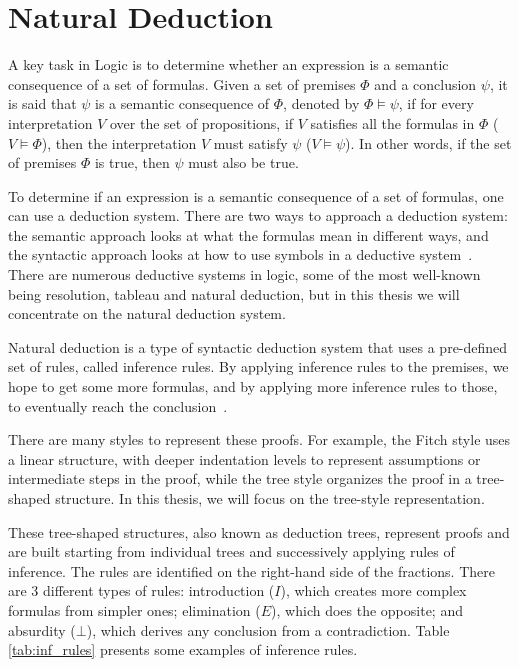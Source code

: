 \section{Natural Deduction} 

\label{chap:prop-decution}
A key task in Logic is to determine whether an expression is a semantic consequence of a set of formulas. Given a set of premises \(\Phi \) and a conclusion \(\psi\), it is said that \(\psi\) is a semantic consequence of \(\Phi \), denoted by \(\Phi  \models \psi \), if for every interpretation \( V \) over the set of propositions, if \( V \) satisfies all the formulas in \(\Phi \) (\( V \models \Phi  \)), then the interpretation \( V \) must satisfy \(\psi\) (\( V \models \psi \)). In other words, if the set of premises \(\Phi \) is true, then \(\psi\) must also be true. 

To determine if an expression is a semantic consequence of a set of formulas, one can use a deduction system. There are two ways to approach a deduction system: the semantic approach looks at what the formulas mean in different ways, and the syntactic approach looks at how to use symbols in a deductive system~\cite{gouveia_lgica}. There are numerous deductive systems in logic, some of the most well-known being  resolution, tableau and natural deduction, but in this thesis we will concentrate on the natural deduction system.

Natural deduction is a type of syntactic deduction system that uses a pre-defined set of rules, called inference rules. By applying inference rules to the premises, we hope to get some more formulas, and by applying more inference rules to those, to eventually reach the conclusion~\cite{huth_2004_logic}.

There are many styles to represent these proofs. For example, the Fitch style uses a linear structure, with deeper indentation levels to represent assumptions or intermediate steps in the proof, while the tree style organizes the proof in a tree-shaped structure. In this thesis, we will focus on the tree-style representation. 

These tree-shaped structures, also known as deduction trees, represent proofs and are built starting from individual trees and successively applying rules of inference. The rules are identified on the right-hand side of the fractions. There are 3 different types of rules: introduction (\(I\)), which creates more complex formulas from simpler ones; elimination (\(E\)), which does the opposite; and absurdity (\(\bot\)), which derives any conclusion from a contradiction. Table \ref{tab:inf_rules} presents some examples of inference rules.

